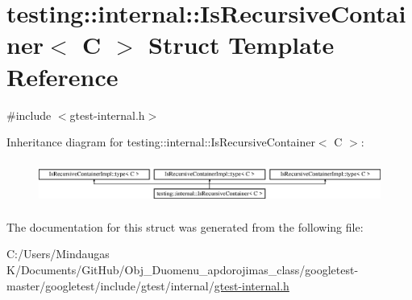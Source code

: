 \hypertarget{structtesting_1_1internal_1_1_is_recursive_container}{}\section{testing\+::internal\+::Is\+Recursive\+Container$<$ C $>$ Struct Template Reference}
\label{structtesting_1_1internal_1_1_is_recursive_container}


{\ttfamily \#include $<$gtest-\/internal.\+h$>$}

Inheritance diagram for testing\+::internal\+::Is\+Recursive\+Container$<$ C $>$\+:\begin{figure}[H]
\begin{center}
\leavevmode
\includegraphics[height=1.414141cm]{dc/d29/structtesting_1_1internal_1_1_is_recursive_container}
\end{center}
\end{figure}


The documentation for this struct was generated from the following file\+:\begin{DoxyCompactItemize}
\item 
C\+:/\+Users/\+Mindaugas K/\+Documents/\+Git\+Hub/\+Obj\+\_\+\+Duomenu\+\_\+apdorojimas\+\_\+class/googletest-\/master/googletest/include/gtest/internal/\mbox{\hyperlink{googletest-master_2googletest_2include_2gtest_2internal_2gtest-internal_8h}{gtest-\/internal.\+h}}\end{DoxyCompactItemize}
